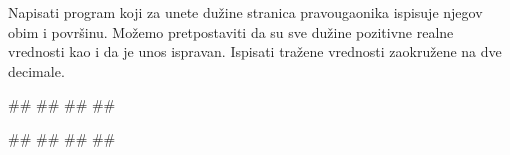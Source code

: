 \begin{comment}
\begin{Exercise}[label=v1.1_07] 
Ovaj zadatak je radjen na praktikumu (jednakostranicni trougao), dole je naveden. Da li da ostane dole ili da se prebaci ovde?
\komentar{Mislim da redosled treba da bude po smislu, a ne po vezbe/praktikum podeli. Zato, ako mu je mesto ovde, onda ga tu treba i prebaciti.}
\komentar{Zadatke poredjati na pocetku i po tipovima, a posle mogu i da se mesaju: dakle da prvo ide par zadataka koji rade sa celobrojnim vrednostima, a onda zadaci koji rade sa realnim vrednostima.}
\komentar{Redosled zadataka je vrlo osetljiva stvar i to bih ostavila za kasniju fazu: za sada samo okvirno kako nam se ucini da treba, a onda posle ce biti jos tumbanja. Zato nije vazno da se brojevi zadataka i resenja poklapaju u ovom trenutku, kada napravimo finalno rasporedjivanje onda cemo da menjamo te brojeve. Za rasporedjivanje zadataka vazna su nam i resenja.}
\linkresenje{v1.1_07}
\end{Exercise}
\begin{Answer}[ref=v1.1_07]
\includecode{resenja/1_KontrolaToka/1.1_UvodniZadaci/1_07.c}
\end{Answer}
\end{comment}

\begin{Exercise}[label=p1.1_02] 
Napisati program koji za unete dužine stranica pravougaonika ispisuje njegov obim i površinu. Možemo pretpostaviti da su sve dužine pozitivne realne vrednosti kao i da je unos ispravan. Ispisati tražene vrednosti zaokružene na dve decimale.\\
\begin{miditest}
\begin{upotreba}{1}
#\naslovInt#
##
##
##
\end{upotreba}
\end{miditest}
\begin{miditest}
\begin{upotreba}{2}
#\naslovInt#
##
##
##
\end{upotreba}
\end{miditest}

\end{Exercise}
\begin{Answer}[ref=p1.1_02]
\end{Answer}

